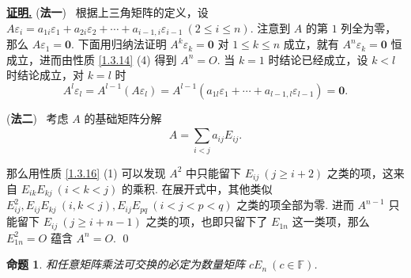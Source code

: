 \documentclass[10pt,openany]{article}
\theoremstyle{thmstyle} %
\theoremstyle{defstyle} %
\theoremstyle{prostyle} %
\newtheorem{proposition}[theorem]{命题}
\theoremstyle{exastyle}
\theoremstyle{remstyle}
\renewenvironment{proof}[1][证明]{\par\underline{\textbf{#1.}} \;\fangsong}{\qed\par}
\newcommand{\F}{\mathbb{F}}
\begin{document}
\begin{proof}
	(\textbf{法一}) \ 根据上三角矩阵的定义，设 \( A\varepsilon_i=a_{1i}\varepsilon_1+a_{2i}\varepsilon_2+\cdots+a_{i-1,i}\varepsilon_{i-1} \ (2 \leq i \leq n)\). 注意到 \( A \) 的第 \( 1 \) 列全为零，那么 \( A\varepsilon_1=\bm{0} \). 下面用归纳法证明 \( A^k\varepsilon_k=\bm{0} \) 对 \( 1 \leq k \leq n \) 成立，就有 \( A^n\varepsilon_k =\bm{0} \) 恒成立，进而由性质 \ref{1.3.14} (4) 得到 \( A^n=O \). 当 \( k=1 \) 时结论已经成立，设 \( k<l \) 时结论成立，对 \( k=l \) 时
	\[ A^l\varepsilon_l= A^{l-1}(A\varepsilon_l)=A^{l-1}(a_{1l}\varepsilon_1+\cdots+a_{l-1,l}\varepsilon_{l-1})=\bm{0}. \]
	
	(\textbf{法二}) \ 考虑 \( A \) 的基础矩阵分解
	\[ A=\sum_{i < j}^{} a_{ij}E_{ij}. \]
	
	那么用性质 \ref{1.3.16} (1) 可以发现 \( A^2 \) 中只能留下 \( E_{ij} \ (j \geq i+2) \) 之类的项，这来自 \( E_{ik}E_{kj} \ (i<k<j) \) 的乘积. 在展开式中，其他类似 \( E_{ij}^2, E_{ij}E_{kj} \ (i,k<j), E_{ij}E_{pq}\ (i<j<p<q) \) 之类的项全部为零. 进而 \( A^{n-1} \) 只能留下 \( E_{ij} \ (j \geq i+n-1) \) 之类的项，也即只留下了 \( E_{1n} \) 这一类项，那么 \( E_{1n}^2=O \) 蕴含 \( A^n=O \).
\end{proof}

\begin{proposition}	\label{1.3.20}
	和任意矩阵乘法可交换的必定为数量矩阵 \( cE_n \ (c \in \F)\).

\end{proposition}
\end{document}
